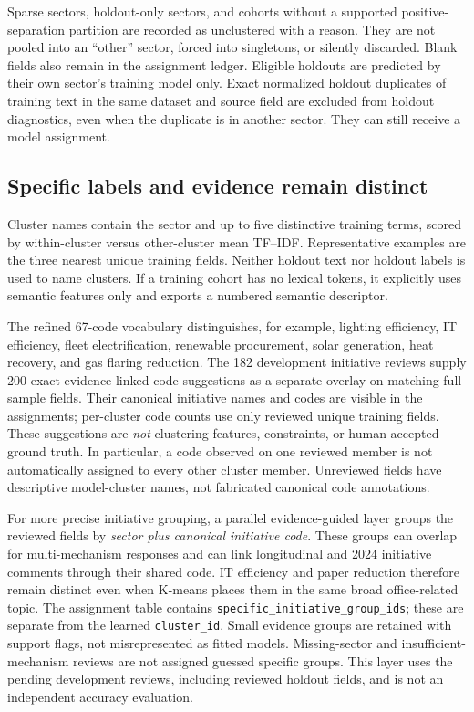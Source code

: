 \documentclass[11pt,a4paper]{article}
\begin{document}
Sparse sectors, holdout-only sectors, and cohorts without a supported
positive-separation partition are recorded as unclustered with a reason.
They are not pooled into an ``other'' sector, forced into singletons, or
silently discarded. Blank fields also remain in the assignment ledger.
Eligible holdouts are predicted by their own sector's training model only.
Exact normalized holdout duplicates of training text in the same dataset
and source field are excluded from holdout diagnostics, even when the
duplicate is in another sector. They can still receive a model assignment.

\subsection{Specific labels and evidence remain distinct}
Cluster names contain the sector and up to five distinctive training
terms, scored by within-cluster versus other-cluster mean TF--IDF.
Representative examples are the three nearest unique training fields.
Neither holdout text nor holdout labels is used to name clusters.
If a training cohort has no lexical tokens, it explicitly uses semantic
features only and exports a numbered semantic descriptor.

The refined 67-code vocabulary distinguishes, for example, lighting
efficiency, IT efficiency, fleet electrification, renewable procurement,
solar generation, heat recovery, and gas flaring reduction.
The 182 development initiative reviews supply 200 exact evidence-linked
code suggestions as a separate overlay on matching full-sample fields.
Their canonical initiative names and codes are visible in the assignments;
per-cluster code counts use only reviewed unique training fields.
These suggestions are \emph{not} clustering features, constraints, or
human-accepted ground truth. In particular, a code observed on one reviewed
member is not automatically assigned to every other cluster member.
Unreviewed fields have descriptive model-cluster names, not fabricated
canonical code annotations.

For more precise initiative grouping, a parallel evidence-guided layer
groups the reviewed fields by \emph{sector plus canonical initiative code}.
These groups can overlap for multi-mechanism responses and can link
longitudinal and 2024 initiative comments through their shared code.
IT efficiency and paper reduction therefore remain distinct even when
K-means places them in the same broad office-related topic. The assignment
table contains \texttt{specific\_initiative\_group\_ids}; these are separate
from the learned \texttt{cluster\_id}. Small evidence groups are retained
with support flags, not misrepresented as fitted models. Missing-sector and
insufficient-mechanism reviews are not assigned guessed specific groups.
This layer uses the pending development reviews, including reviewed holdout
fields, and is not an independent accuracy evaluation.
\end{document}
